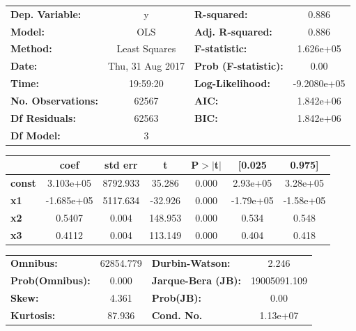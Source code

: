 \documentclass{article}
\begin{document}
\begin{center}
\begin{tabular}{lclc}
\toprule
\textbf{Dep. Variable:}    &        y         & \textbf{  R-squared:         } &      0.886    \\
\textbf{Model:}            &       OLS        & \textbf{  Adj. R-squared:    } &      0.886    \\
\textbf{Method:}           &  Least Squares   & \textbf{  F-statistic:       } &  1.626e+05    \\
\textbf{Date:}             & Thu, 31 Aug 2017 & \textbf{  Prob (F-statistic):} &      0.00     \\
\textbf{Time:}             &     19:59:20     & \textbf{  Log-Likelihood:    } & -9.2080e+05   \\
\textbf{No. Observations:} &       62567      & \textbf{  AIC:               } &  1.842e+06    \\
\textbf{Df Residuals:}     &       62563      & \textbf{  BIC:               } &  1.842e+06    \\
\textbf{Df Model:}         &           3      & \textbf{                     } &               \\
\bottomrule
\end{tabular}
\begin{tabular}{lcccccc}
               & \textbf{coef} & \textbf{std err} & \textbf{t} & \textbf{P$>$$|$t$|$} & \textbf{[0.025} & \textbf{0.975]}  \\
\midrule
\textbf{const} &    3.103e+05  &     8792.933     &    35.286  &         0.000        &     2.93e+05    &     3.28e+05     \\
\textbf{x1}    &   -1.685e+05  &     5117.634     &   -32.926  &         0.000        &    -1.79e+05    &    -1.58e+05     \\
\textbf{x2}    &       0.5407  &        0.004     &   148.953  &         0.000        &        0.534    &        0.548     \\
\textbf{x3}    &       0.4112  &        0.004     &   113.149  &         0.000        &        0.404    &        0.418     \\
\bottomrule
\end{tabular}
\begin{tabular}{lclc}
\textbf{Omnibus:}       & 62854.779 & \textbf{  Durbin-Watson:     } &      2.246    \\
\textbf{Prob(Omnibus):} &    0.000  & \textbf{  Jarque-Bera (JB):  } & 19005091.109  \\
\textbf{Skew:}          &    4.361  & \textbf{  Prob(JB):          } &       0.00    \\
\textbf{Kurtosis:}      &   87.936  & \textbf{  Cond. No.          } &   1.13e+07    \\
\bottomrule
\end{tabular}
\end{center}
\end{document}
